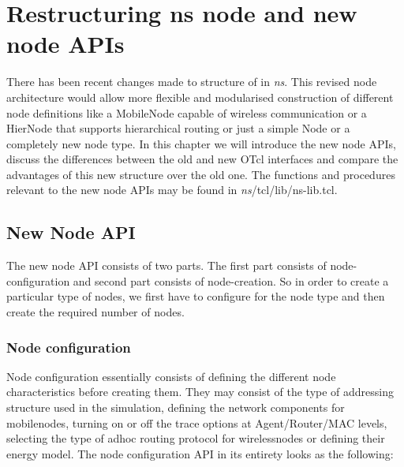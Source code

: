 \chapter{Restructuring ns node and new node APIs}
\label{chap:newnode}

There has been recent changes made to structure of 
 in \emph{ns}. This revised node architecture would
allow more flexible and modularised construction of different node
definitions like a MobileNode capable of wireless communication or a
HierNode that supports hierarchical routing or just a simple Node or a 
completely new node type. In this chapter we will introduce the new node
APIs, discuss the differences between the old and new
OTcl interfaces and compare the advantages of this new structure over the
old one. The functions and procedures relevant to the new node APIs may be
found in \emph{ns}/tcl/lib/ns-lib.tcl.

\section{New Node API}
\label{sec:newnode-API}

The new node API consists of two parts. The first part consists of
node-configuration and second part consists of node-creation. So in order
to create a particular type of nodes, we first have to configure for the 
node type and then create the required number of nodes.

\subsection{Node configuration}
\label{sec:nodeconfig}

Node configuration essentially consists of defining the different node
characteristics before creating them. They may consist of the type of
addressing structure used in the simulation, defining the network
components for mobilenodes, turning on or off the trace options at
Agent/Router/MAC levels, selecting the type of adhoc routing protocol for
wirelessnodes or defining their energy model.
The node configuration API in its entirety looks as the following:

